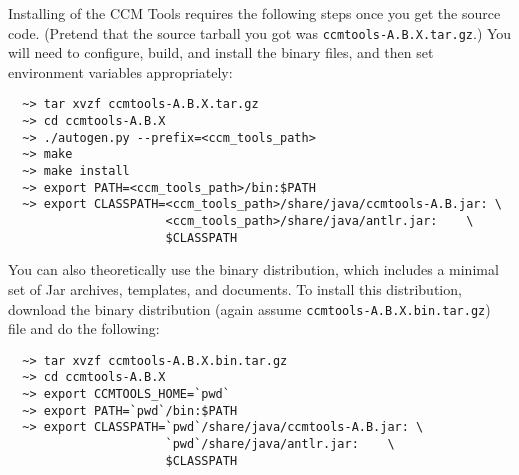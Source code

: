 Installing of the CCM Tools requires the following steps once you get the source
code. (Pretend that the source tarball you got was {\tt ccmtools-A.B.X.tar.gz}.)
You will need to configure, build, and install the binary files, and then set
environment variables appropriately:
\begin{small}
\begin{verbatim}
  ~> tar xvzf ccmtools-A.B.X.tar.gz
  ~> cd ccmtools-A.B.X
  ~> ./autogen.py --prefix=<ccm_tools_path>
  ~> make
  ~> make install
  ~> export PATH=<ccm_tools_path>/bin:$PATH
  ~> export CLASSPATH=<ccm_tools_path>/share/java/ccmtools-A.B.jar: \
                      <ccm_tools_path>/share/java/antlr.jar:    \
                      $CLASSPATH
\end{verbatim}
\end{small}

You can also theoretically use the binary distribution, which includes a minimal
set of Jar archives, templates, and documents. To install this distribution,
download the binary distribution (again assume {\tt ccmtools-A.B.X.bin.tar.gz})
file and do the following:
\begin{small}
\begin{verbatim}
  ~> tar xvzf ccmtools-A.B.X.bin.tar.gz
  ~> cd ccmtools-A.B.X
  ~> export CCMTOOLS_HOME=`pwd`
  ~> export PATH=`pwd`/bin:$PATH
  ~> export CLASSPATH=`pwd`/share/java/ccmtools-A.B.jar: \
                      `pwd`/share/java/antlr.jar:    \
                      $CLASSPATH
\end{verbatim}
\end{small}

